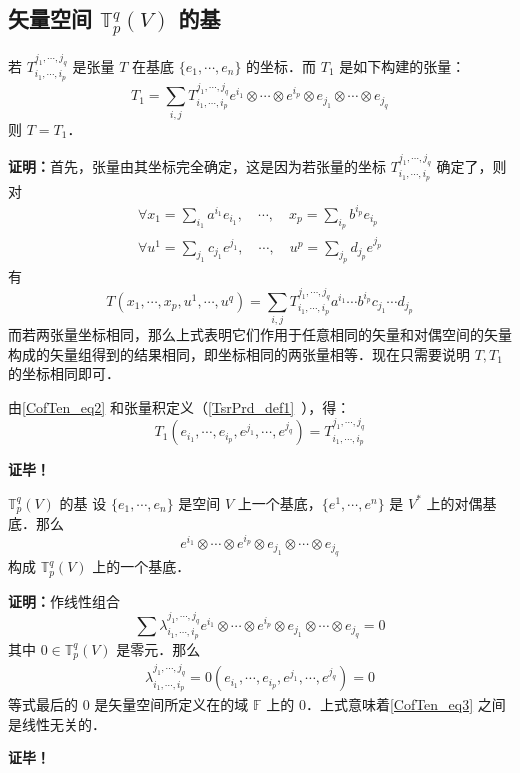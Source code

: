 \subsection{矢量空间 $\mathbb T^q_p(V)$ 的基}
\begin{theorem}{}
若 $T^{j_1,\cdots,j_q}_{i_1,\cdots,i_p}$ 是张量 $T$ 在基底 $\{e_1,\cdots,e_n\}$ 的坐标．而 $T_1$ 是如下构建的张量：
\begin{equation}\label{CofTen_eq2}
T_1=\sum_{i,j}T^{j_1,\cdots,j_q}_{i_1,\cdots,i_p}e^{i_1}\otimes\cdots\otimes e^{i_p}\otimes e_{j_1}\otimes\cdots\otimes e_{j_q}
\end{equation}
则 $T=T_1$．
\end{theorem}
\textbf{证明：}首先，张量由其坐标完全确定，这是因为若张量的坐标 $T^{j_1,\cdots,j_q}_{i_1,\cdots,i_p}$ 确定了，则对
\begin{equation}
\begin{aligned}
\forall x_1=\sum_{i_1}a^{i_1}e_{i_1},\quad\cdots,\quad x_p=\sum_{i_p}b^{i_p}e_{i_p}\\
\forall u^1=\sum_{j_1}c_{j_1}e^{j_1},\quad\cdots,\quad u^p=\sum_{j_p}d_{j_p}e^{j_p}
\end{aligned}
\end{equation}
有 
\begin{equation}\label{CofTen_eq1}
T(x_1,\cdots,x_p,u^1,\cdots,u^q)=\sum_{i,j}T^{j_1,\cdots,j_q}_{i_1,\cdots,i_p}a^{i_1}\cdots b^{i_p}c_{j_1}\cdots d_{j_p}
\end{equation}
而若两张量坐标相同，那么上式表明它们作用于任意相同的矢量和对偶空间的矢量构成的矢量组得到的结果相同，即坐标相同的两张量相等．现在只需要说明 $T,T_1$ 的坐标相同即可．

由\autoref{CofTen_eq2} 和张量积定义（\autoref{TsrPrd_def1}~），得：
\begin{equation}
T_1(e_{i_1},\cdots,e_{i_p},e^{j_1},\cdots,e^{j_q})=T^{j_1,\cdots,j_q}_{i_1,\cdots,i_p}
\end{equation}

\textbf{证毕！}
 \begin{theorem}{ $\mathbb T^q_p(V)$ 的基}
 设 $\{e_1,\cdots,e_n\}$ 是空间 $V$ 上一个基底，$\{e^1,\cdots,e^n\}$ 是 $V^*$ 上的对偶基底．那么
\begin{equation}\label{CofTen_eq3}
e^{i_1}\otimes\cdots\otimes e^{i_p}\otimes e_{j_1}\otimes\cdots\otimes e_{j_q}
\end{equation}
构成 $\mathbb T_p^q(V)$ 上的一个基底． 
 \end{theorem}
 \textbf{证明：}作线性组合
 \begin{equation}
 \sum\lambda^{j_1,\cdots,j_q}_{i_1,\cdots,i_p}e^{i_1}\otimes\cdots\otimes e^{i_p}\otimes e_{j_1}\otimes\cdots\otimes e_{j_q}=0
 \end{equation}
 其中 $0\in \mathbb T^q_p(V)$ 是零元．那么
 \begin{equation}
 \begin{aligned}
 \lambda^{j_1,\cdots,j_q}_{i_1,\cdots,i_p}=0(e_{i_1},\cdots,e_{i_p},e^{j_1},\cdots,e^{j_q})=0
 \end{aligned}
 \end{equation}
等式最后的 $0$ 是矢量空间所定义在的域 $\mathbb F$ 上的 $0$．上式意味着\autoref{CofTen_eq3} 之间是线性无关的．

\textbf{证毕！}